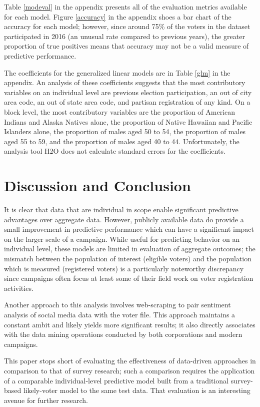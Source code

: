 \documentclass[12pt]{article}
\begin{document}
Table \ref{modeval} in the appendix presents all of the evaluation metrics available for each model. Figure \ref{accuracy} in the appendix shoes a bar chart of the accuracy for each model; however, since around 75\% of the voters in the dataset participated in 2016 (an unusual rate compared to previous years), the greater proportion of true positives means that accuracy may not be a valid measure of predictive performance. 

The coefficients for the generalized linear models are in Table \ref{glm} in the appendix. An analysis of these coefficients suggests that the most contributory variables on an individual level are previous election participation, an out of city area code, an out of state area code, and partisan registration of any kind. On a block level, the most contributory variables are the proportion of American Indians and Alaska Natives alone, the proportion of Native Hawaiian and Pacific Islanders alone, the proportion of males aged 50 to 54, the proportion of males aged 55 to 59, and the proportion of males aged 40 to 44. Unfortunately, the analysis tool H2O does not calculate standard errors for the coefficients.

\section{Discussion and Conclusion}

It is clear that data that are individual in scope enable significant predictive advantages over aggregate data. However, publicly available data do provide a small improvement in predictive performance which can have a significant impact on the larger scale of a campaign. While useful for predicting behavior on an individual level, these models are limited in evaluation of aggregate outcomes; the mismatch between the population of interest (eligible voters) and the population which is measured (registered voters) is a particularly noteworthy discrepancy since campaigns often focus at least some of their field work on voter registration activities.

Another approach to this analysis involves web-scraping to pair sentiment analysis of social media data with the voter file. This approach maintains a constant ambit and likely yields more significant results; it also directly associates with the data mining operations conducted by both corporations and modern campaigns. 

This paper stops short of evaluating the effectiveness of data-driven approaches in comparison to that of survey research; such a comparison requires the application of a comparable individual-level predictive model built from a traditional survey-based likely-voter model to the same test data. That evaluation is an interesting avenue for further research.
\end{document}
